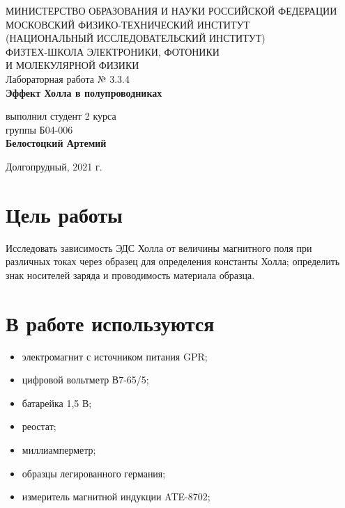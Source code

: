 \documentclass[a4paper,12pt]{article}
\begin{document}
 

\begin{titlepage}
	\begin{center}
		\large 	МИНИСТЕРСТВО ОБРАЗОВАНИЯ И НАУКИ РОССИЙСКОЙ ФЕДЕРАЦИИ\\
				МОСКОВСКИЙ ФИЗИКО-ТЕХНИЧЕСКИЙ ИНСТИТУТ \\
				(НАЦИОНАЛЬНЫЙ ИССЛЕДОВАТЕЛЬСКИЙ ИНСТИТУТ)\\ 
				ФИЗТЕХ-ШКОЛА ЭЛЕКТРОНИКИ, ФОТОНИКИ \\
				И МОЛЕКУЛЯРНОЙ ФИЗИКИ \\
		
		
		\vspace{4.0 cm}
		Лабораторная работа № 3.3.4 \\ 
		\LARGE \textbf{Эффект Холла в полупроводниках}
	\end{center}
	\vspace{3 cm} \large
	
	\begin{flushright}
		выполнил студент 2 курса \\
		{группы Б04-006}\\
		\textbf{Белостоцкий Артемий}\\
	\end{flushright}
	
	\vfill

	\begin{center}
	Долгопрудный, 2021 г.
	\end{center}
\end{titlepage}                                                                      
 
\section{Цель работы}
Исследовать зависимость ЭДС Холла от величины магнитного поля при различных токах через образец для определения константы Холла; определить знак носителей заряда и проводимость материала образца.

\section{В работе используются}
	\begin{itemize}
	\item электромагнит с источником питания GPR;
	\item цифровой вольтметр В7-65/5;
	\item батарейка 1,5 В;
	\item реостат;
	\item миллиамперметр;
	\item образцы легированного германия;
	\item измеритель магнитной индукции ATE-8702;
	\end{itemize}
\end{document}
